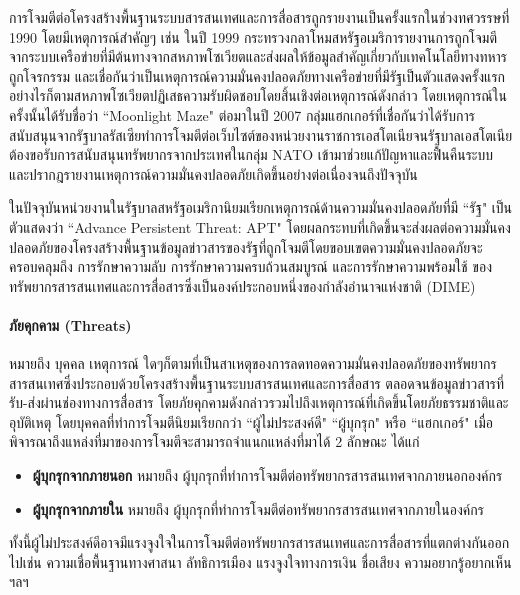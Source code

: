 \documentclass[../th_cyber_warfare_distilled.tex]{subfiles}
\begin{document}
การโจมตีต่อโครงสร้างพื้นฐานระบบสารสนเทศและการสื่อสารถูกรายงานเป็นครั้งแรกในช่วงทศวรรษที่ 1990 โดยมีเหตุการณ์สำคัญๆ เช่น ในปี 1999 กระทรวงกลาโหมสหรัฐอเมริการายงานการถูกโจมตีจากระบบเครือข่ายที่มีต้นทางจากสหภาพโซเวียตและส่งผลให้ข้อมูลสำคัญเกี่ยวกับเทคโนโลยีทางทหารถูกโจรกรรม และเชื่อกันว่าเป็นเหตุการณ์ความมั่นคงปลอดภัยทางเครือข่ายที่มีรัฐเป็นตัวแสดงครั้งแรก  อย่างไรก็ตามสหภาพโซเวียตปฏิเสธความรับผิดชอบโดยสิ้นเชิงต่อเหตุการณ์ดังกล่าว โดยเหตุการณ์ในครั้งนั้นได้รับชื่อว่า ``Moonlight Maze" ต่อมาในปี  2007 กลุ่มแฮกเกอร์ที่เชื่อกันว่าได้รับการสนับสนุนจากรัฐบาลรัสเซียทำการโจมตีต่อเว็บไซต์ของหน่วยงานราชการเอสโตเนียจนรัฐบาลเอสโตเนียต้องขอรับการสนับสนุนทรัพยากรจากประเทศในกลุ่ม NATO เข้ามาช่วยแก้ปัญหาและฟื้นคืนระบบ และปรากฎรายงานเหตุการณ์ความมั่นคงปลอดภัยเกิดขึ้นอย่างต่อเนื่องจนถึงปัจจุบัน

ในปัจจุบันหน่วยงานในรัฐบาลสหรัฐอเมริกานิยมเรียกเหตุการณ์ด้านความมั่นคงปลอดภัยที่มี ``รัฐ" เป็นตัวแสดงว่า ``Advance Persistent Threat: APT" โดยผลกระทบที่เกิดขึ้นจะส่งผลต่อความมั่นคงปลอดภัยของโครงสร้างพื้นฐานข้อมูลข่าวสารของรัฐที่ถูกโจมตีโดยขอบเขตความมั่นคงปลอดภัยจะครอบคลุมถึง การรักษาความลับ การรักษาความครบถ้วนสมบูรณ์ และการรักษาความพร้อมใช้ ของทรัพยากรสารสนเทศและการสื่อสารซึ่งเป็นองค์ประกอบหนึ่งของกำลังอำนาจแห่งชาติ (DIME)



\paragraph{ภัยคุกคาม (Threats)}
หมายถึง บุคคล เหตุการณ์ ใดๆก็ตามที่เป็นสาเหตุของการลดทอดความมั่นคงปลอดภัยของทรัพยากรสารสนเทศซึ่งประกอบด้วยโครงสร้างพื้นฐานระบบสารสนเทศและการสื่อสาร ตลอดจนข้อมูลข่าวสารที่รับ-ส่งผ่านช่องทางการสื่อสาร โดยภัยคุกคามดังกล่าวรวมไปถึงเหตุการณ์ที่เกิดขึ้นโดยภัยธรรมชาติและอุบัติเหตุ โดยบุคคลที่ทำการโจมตีนิยมเรียกกว่า ``ผู้ไม่ประสงค์ดี" ``ผู้บุกรุก"  หรือ ``แฮกเกอร์" เมื่อพิจารณาถึงแหล่งที่มาของการโจมตีจะสามารถจำแนกแหล่งที่มาได้ 2 ลักษณะ ได้แก่
\begin{itemize}
	\item \textbf{ผู้บุกรุกจากภายนอก} หมายถึง ผู้บุกรุกที่ทำการโจมตีต่อทรัพยากรสารสนเทศจากภายนอกองค์กร
	\item \textbf{ผู้บุกรุกจากภายใน} หมายถึง ผู้บุกรุกที่ทำการโจมตีต่อทรัพยากรสารสนเทศจากภายในองค์กร
\end{itemize}
\par
ทั้งนี้ผู้ไม่ประสงค์ดีอาจมีแรงจูงใจในการโจมตีต่อทรัพยากรสารสนเทศและการสื่อสารที่แตกต่างกันออกไปเช่น ความเชื่อพื้นฐานทางศาสนา ลัทธิการเมือง แรงจูงใจทางการเงิน ชื่อเสียง ความอยากรู้อยากเห็น ฯลฯ
\end{document}
